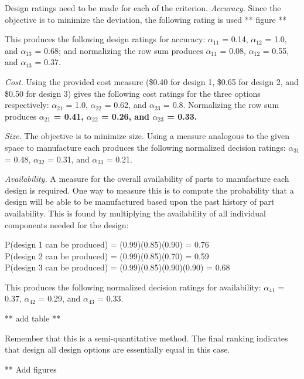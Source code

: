 \begin{enumerate}
\begin{onlysolution}
    Design ratings need to be made for each of the criterion.
    \textit{Accuracy.} Since the objective is to minimize the deviation, 
    the following rating is used 
      ** figure ** 
    
    This produces the following design ratings for accuracy: $\alpha_{11}$ = 0.14, $\alpha_{12}$ = 1.0, 
    and $\alpha_{13}$ = 0.68; and normalizing the row sum produces $\alpha_{11}$ = 0.08, $\alpha_{12}$ = 0.55, 
    and $\alpha_{13}$ = 0.37.

    \textit{Cost.} Using the provided cost measure (\$0.40 for design 1, \$0.65 for design 
    2, and \$0.50 for design 3) gives the following cost ratings for the three options 
    respectively: $\alpha_{21}$ = 1.0, $\alpha_{22}$ = 0.62, and $\alpha_{23}$ = 0.8. Normalizing the row sum produces 
    \textbf{$\alpha_{21}$ = 0.41, $\alpha_{22}$ = 0.26, and $\alpha_{23}$ = 0.33.}

    \textit{Size.} The objective is to minimize size. Using a measure analogous to the given 
    space to manufacture each produces the following normalized decision ratings: 
$\alpha_{31}$ = 0.48, $\alpha_{32}$ = 0.31, and $\alpha_{33}$ = 0.21.

    \textit{Availability.} A measure for the overall availability of parts to manufacture 
    each design is required. One way to measure this is to compute the probability that a 
    design will be able to be manufactured based upon the past history of part availability. 
    This is found by multiplying the availability of all individual components needed for 
    the design:

      P(design 1 can be produced) = (0.99)(0.85)(0.90) = 0.76\\
      P(design 2 can be produced) = (0.99)(0.85)(0.70) = 0.59\\
      P(design 3 can be produced) = (0.99)(0.85)(0.90)(0.90) = 0.68



    This produces the following normalized decision ratings for availability: 
    $\alpha_{41}$ = 0.37, $\alpha_{42}$ = 0.29, and $\alpha_{43}$ = 0.33.

      ** add table **

    Remember that this is a semi-quantitative method. The final ranking indicates that design 
    all design options are essentially equal in this case.

      ** Add figures
  \end{onlysolution}


\end{enumerate}
